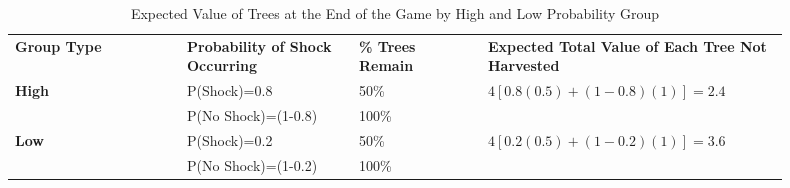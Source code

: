 \begin{table}[htbp!]
  \centering
  \caption{Expected Value of Trees at the End of the Game by High and Low Probability Group}\label{tab:7}
  \begin{tabular}{p{0.2\linewidth} | p{0.2\linewidth} | p{0.15\linewidth} | p{0.35\linewidth}}
    \toprule
    \textbf{Group Type} & \textbf{Probability of Shock Occurring} & \textbf{\% Trees Remain} & \textbf{Expected Total Value of Each Tree Not Harvested} \\ %
    \multirow{2}{*}{\textbf{High}} & P(Shock)=0.8 & 50\% & \multirow{2}{*}{$ 4 \left[0.8(0.5)+(1-0.8)(1)\right]=2.4$} \\ \cline{2-3}
     & P(No Shock)=(1-0.8) & 100\%  \\ %
    \multirow{2}{*}{\textbf{Low}} & P(Shock)=0.2 & 50\% & \multirow{2}{*}{$ 4 \left[0.2(0.5)+(1-0.2)(1)\right]=3.6$} \\ \cline{2-3}
    & P(No Shock)=(1-0.2) & 100\%  \\
    \bottomrule
  \end{tabular}
\end{table}
